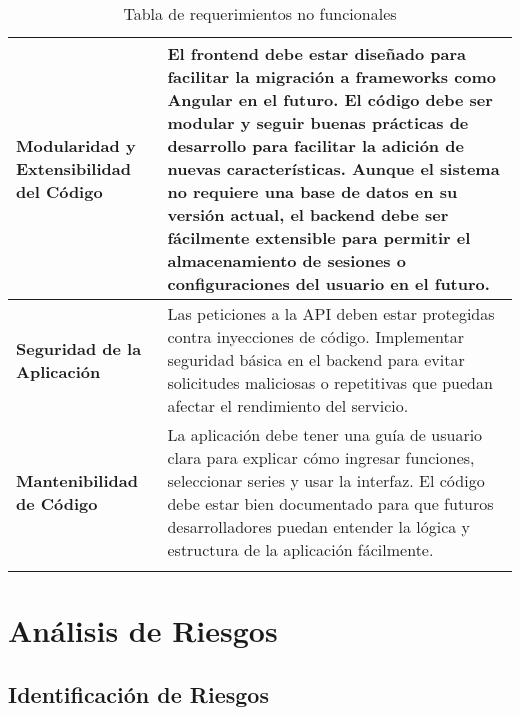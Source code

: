 \begin{longtable}{|m{5cm}|m{10cm}|}
	\hline
	\textbf{Modularidad y Extensibilidad del Código} & El frontend debe estar diseñado para facilitar la migración a frameworks como Angular en el futuro. El código debe ser modular y seguir buenas prácticas de desarrollo para facilitar la adición de nuevas características. Aunque el sistema no requiere una base de datos en su versión actual, el backend debe ser fácilmente extensible para permitir el almacenamiento de sesiones o configuraciones del usuario en el futuro. \\
	\hline
	\textbf{Seguridad de la Aplicación} & Las peticiones a la API deben estar protegidas contra inyecciones de código. Implementar seguridad básica en el backend para evitar solicitudes maliciosas o repetitivas que puedan afectar el rendimiento del servicio. \\
	\hline
	\textbf{Mantenibilidad de Código} & La aplicación debe tener una guía de usuario clara para explicar cómo ingresar funciones, seleccionar series y usar la interfaz. El código debe estar bien documentado para que futuros desarrolladores puedan entender la lógica y estructura de la aplicación fácilmente. \\
	\hline
	\rowcolor{white} \caption{Tabla de requerimientos no funcionales} \label{tabla:RNF} \\
\end{longtable}




\section{Análisis de Riesgos}
\subsection{Identificación de Riesgos}
